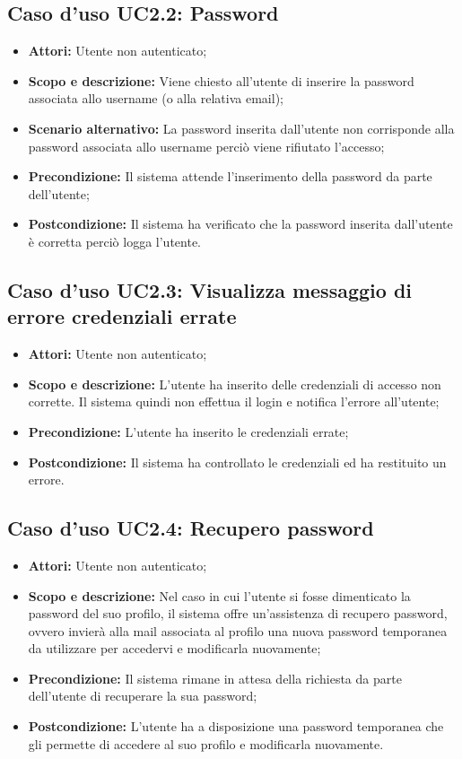 \documentclass[12pt,a4paper,titlepage]{article}
\begin{document}
	\subsection{Caso d'uso UC2.2: Password}
	\label{UC2.2}
	\begin{itemize}
		\item \textbf{Attori: }Utente non autenticato;
		\item \textbf{Scopo e descrizione: }Viene chiesto all'utente di inserire la password associata allo username (o alla relativa email);
		\item \textbf{Scenario alternativo: }La password inserita dall'utente non corrisponde alla password associata allo username perciò viene rifiutato l'accesso;
		\item \textbf{Precondizione: }Il sistema attende l'inserimento della password da parte dell'utente;
		\item \textbf{Postcondizione: }Il sistema ha verificato che la password inserita dall'utente è corretta perciò logga l'utente.
	\end{itemize}
	\subsection{Caso d'uso UC2.3: Visualizza messaggio di errore credenziali errate}
	\label{UC2.3}
	\begin{itemize}
		\item \textbf{Attori: }Utente non autenticato;
		\item \textbf{Scopo e descrizione: }L'utente ha inserito delle credenziali di accesso non corrette. Il sistema quindi non effettua il login e notifica l'errore all'utente;
		\item \textbf{Precondizione: }L'utente ha inserito le credenziali errate;
		\item \textbf{Postcondizione: }Il sistema ha controllato le credenziali ed ha restituito un errore.
	\end{itemize}
	\subsection{Caso d'uso UC2.4: Recupero password}
	\label{UC2.4}
	\begin{itemize}
		\item \textbf{Attori: }Utente non autenticato;
		\item \textbf{Scopo e descrizione: }Nel caso in cui l'utente si fosse dimenticato la password del suo profilo, il sistema offre un'assistenza di recupero password, ovvero invierà alla mail associata al profilo una nuova password temporanea da utilizzare per accedervi e modificarla nuovamente;
		\item \textbf{Precondizione: }Il sistema rimane in attesa della richiesta da parte dell'utente di recuperare la sua password;
		\item \textbf{Postcondizione: }L'utente ha a disposizione una password temporanea che gli permette di accedere al suo profilo e modificarla nuovamente.
	\end{itemize}
\end{document}
